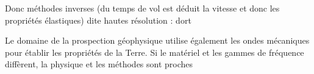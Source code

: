 Donc méthodes inverses (du temps de vol est déduit la vitesse et donc les propriétés élastiques) dite hautes résolution :
dort


Le domaine de la prospection géophysique utilise également les ondes mécaniques pour établir les propriétés de la Terre. Si le matériel et les gammes de  fréquence diffèrent, la physique et les méthodes sont proches




	

